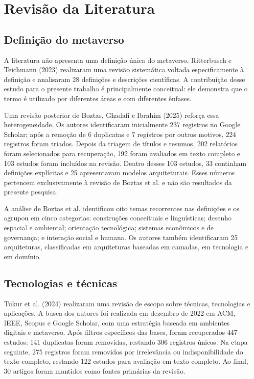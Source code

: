 \chapter{Revisão da Literatura}
\label{cha:revisao}

\section{Definição do metaverso}
\label{sec:metaverso}

A literatura não apresenta uma definição única do metaverso. Ritterbusch e Teichmann (2023) realizaram uma revisão sistemática voltada especificamente à definição e analisaram 28 definições e descrições científicas. A contribuição desse estudo para o presente trabalho é principalmente conceitual: ele demonstra que o termo é utilizado por diferentes áreas e com diferentes ênfases. \cite{ritterbusch2023}

Uma revisão posterior de Boztas, Ghadafi e Ibrahim (2025) reforça essa heterogeneidade. Os autores identificaram inicialmente 237 registros no Google Scholar; após a remoção de 6 duplicatas e 7 registros por outros motivos, 224 registros foram triados. Depois da triagem de títulos e resumos, 202 relatórios foram selecionados para recuperação, 192 foram avaliados em texto completo e 103 estudos foram incluídos na revisão. Dentro desses 103 estudos, 33 continham definições explícitas e 25 apresentavam modelos arquiteturais. Esses números pertencem exclusivamente à revisão de Boztas et al. e não são resultados da presente pesquisa. \cite{boztas2025}

A análise de Boztas et al. identificou oito temas recorrentes nas definições e os agrupou em cinco categorias: construções conceituais e linguísticas; desenho espacial e ambiental; orientação tecnológica; sistemas econômicos e de governança; e interação social e humana. Os autores também identificaram 25 arquiteturas, classificadas em arquiteturas baseadas em camadas, em tecnologia e em domínio. \cite{boztas2025}

\section{Tecnologias e técnicas}

Tukur et al. (2024) realizaram uma revisão de escopo sobre técnicas, tecnologias e aplicações. A busca dos autores foi realizada em dezembro de 2022 em ACM, IEEE, Scopus e Google Scholar, com uma estratégia baseada em ambientes digitais e metaverso. Após filtros específicos das bases, foram recuperados 447 estudos; 141 duplicatas foram removidas, restando 306 registros únicos. Na etapa seguinte, 275 registros foram removidos por irrelevância ou indisponibilidade do texto completo, restando 122 estudos para avaliação em texto completo. Ao final, 30 artigos foram mantidos como fontes primárias da revisão. \cite{tukur2024}

